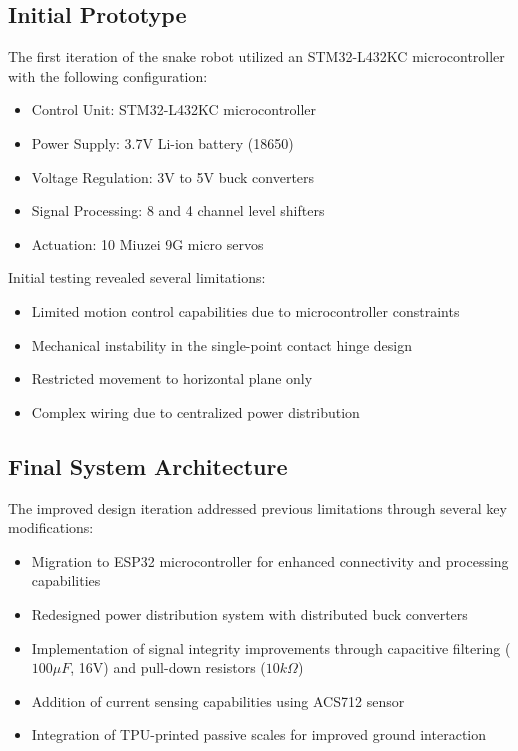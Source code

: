 \documentclass[12pt,a4paper]{report}
\begin{document}
\subsection{Initial Prototype}
The first iteration of the snake robot utilized an STM32-L432KC microcontroller with the following configuration:
\begin{itemize}
    \item Control Unit: STM32-L432KC microcontroller
    \item Power Supply: 3.7V Li-ion battery (18650)
    \item Voltage Regulation: 3V to 5V buck converters
    \item Signal Processing: 8 and 4 channel level shifters
    \item Actuation: 10 Miuzei 9G micro servos
\end{itemize}

Initial testing revealed several limitations:
\begin{itemize}
    \item Limited motion control capabilities due to microcontroller constraints
    \item Mechanical instability in the single-point contact hinge design
    \item Restricted movement to horizontal plane only
    \item Complex wiring due to centralized power distribution
\end{itemize}

\subsection{Final System Architecture}
The improved design iteration addressed previous limitations through several key modifications:
\begin{itemize}
    \item Migration to ESP32 microcontroller for enhanced connectivity and processing capabilities
    \item Redesigned power distribution system with distributed buck converters
    \item Implementation of signal integrity improvements through capacitive filtering ($100\mu F$, 16V) and pull-down resistors ($10k\Omega$)
    \item Addition of current sensing capabilities using ACS712 sensor
    \item Integration of TPU-printed passive scales for improved ground interaction
\end{itemize}
\end{document}
